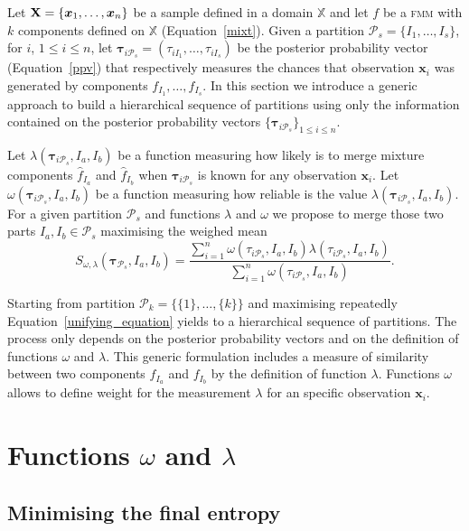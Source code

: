 \documentclass[10pt, a4paper]{article}
\newcommand{\m}[1]{\boldsymbol{#1}}
\newcommand{\fmm}{\textsc{fmm}\xspace}
\begin{document}
\begin{spacing}{1.9}
Let $\text{\textbf{X}} = \{\m x_1,\dots,\m x_n \}$ be a sample defined in  a domain $\mathbb{X}$ and let $f$ be a \fmm with $k$ components defined on $\mathbb{X}$ (Equation~\ref{mixt}). Given a partition $\mathcal{P}_s = \{I_1, \dots, I_s\}$, for $i$, $1\leq i \leq n $, let $\m\tau_{i \mathcal{P}_s}= \left( \tau_{i I_1} , \dots, \tau_{i I_s}  \right)$ be the posterior probability vector (Equation~\ref{ppv}) that respectively measures the chances that observation $\m x_i$ was generated by components $f_{I_1}, \dots, f_{I_s}$. In this section we introduce a generic approach to build a hierarchical sequence of partitions using only the information contained on the posterior probability vectors $\{\m\tau_{i \mathcal{P}_s}\}_{1\leq i \leq n}$.


Let $\lambda(\m\tau_{i \mathcal{P}_s},  I_a,  I_b)$ be a function measuring how likely is to merge mixture components $\hat{f}_{I_a}$ and $\hat{f}_{I_b}$ when $\m \tau_{i \mathcal{P}_s}$ is known for any observation $\m x_i$. Let $\omega(\m\tau_{i \mathcal{P}_s},  I_a,  I_b)$ be a function measuring how reliable is the value $\lambda(\m\tau_{i \mathcal{P}_s},  I_a,  I_b)$.  For a given partition $\mathcal{P}_s$ and functions $\lambda$ and $\omega$ we propose to merge those two parts $I_a, I_b \in \mathcal{P}_s$ maximising the weighed mean
\begin{equation}\label{unifying_equation}
S_{\omega, \lambda}( \m\tau_{\mathcal{P}_s},  I_a,  I_b) = \frac{\sum_{i=1}^n \omega(\tau_{i \mathcal{P}_s}, I_a, I_b) \lambda(\tau_{i \mathcal{P}_s}, I_a, I_b)}{\sum_{i=1}^n \omega(\tau_{i \mathcal{P}_s}, I_a, I_b) }.
\end{equation}


Starting from partition $\mathcal{P}_k = \{ \{1\}, \dots, \{k\} \}$ and maximising repeatedly Equation~\ref{unifying_equation} yields to a hierarchical sequence of partitions. The process only depends on the posterior probability vectors and on the definition of functions $\omega$ and $\lambda$. This generic formulation includes a measure of similarity between two components $f_{I_a}$ and $f_{I_b}$ by the definition of function $\lambda$. Functions $\omega$ allows to define weight for the measurement $\lambda$ for an specific observation $\m x_i$.

\section{Functions $\omega$ and $\lambda$}\label{function_examples}

\subsection{Minimising the final entropy}
\label{entropy_section}


\end{spacing}
\end{document}
